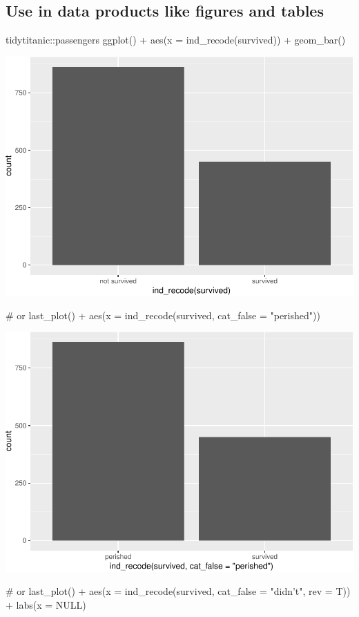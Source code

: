 \hypertarget{use-in-data-products-like-figures-and-tables}{%
\subsection{Use in data products like figures and
tables}\label{use-in-data-products-like-figures-and-tables}}

\begin{Schunk}
\begin{Sinput}
tidytitanic::passengers %
ggplot() + 
  aes(x = ind_recode(survived)) + 
  geom_bar()
\end{Sinput}

\includegraphics[width=0.69\linewidth]{r_journal_files/figure-latex/unnamed-chunk-13-1} \begin{Sinput}
# or
last_plot() +
  aes(x = ind_recode(survived, cat_false = "perished"))
\end{Sinput}

\includegraphics[width=0.69\linewidth]{r_journal_files/figure-latex/unnamed-chunk-13-2} \begin{Sinput}
# or
last_plot() +
  aes(x = ind_recode(survived, cat_false = "didn't", rev = T)) + 
  labs(x = NULL)
\end{Sinput}


\end{Schunk}
